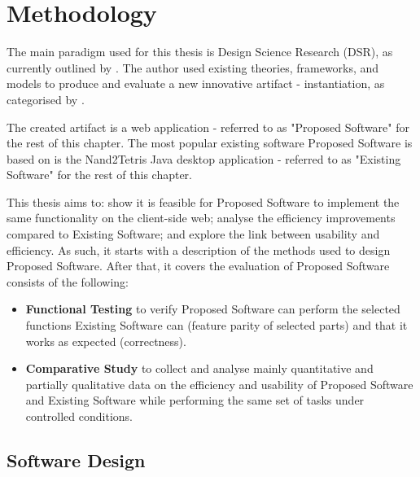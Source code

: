\chapter{Methodology}
\label{chap:methodology}

The main paradigm used for this thesis is Design Science Research (DSR), as currently outlined by \textcite{brocke2020designscience}.
The author used existing theories, frameworks, and models to produce and evaluate a new innovative artifact - instantiation, as categorised by \textcite{hevner2004designscience}.

The created artifact is a web application - referred to as "Proposed Software" for the rest of this chapter.
The most popular existing software Proposed Software is based on is the Nand2Tetris Java desktop application - referred to as "Existing Software" for the rest of this chapter.

This thesis aims to: show it is feasible for Proposed Software to implement the same functionality on the client-side web; analyse the efficiency improvements compared to Existing Software; and explore the link between usability and efficiency.
As such, it starts with a description of the methods used to design Proposed Software.
After that, it covers the evaluation of Proposed Software consists of the following:

\begin{itemize}
    \item \textbf{Functional Testing} to verify Proposed Software can perform the selected functions Existing Software can (feature parity of selected parts) and that it works as expected (correctness).
    \item \textbf{Comparative Study} to collect and analyse mainly quantitative and partially qualitative data on the efficiency and usability of Proposed Software and Existing Software while performing the same set of tasks under controlled conditions.
\end{itemize}

\section{Software Design}



